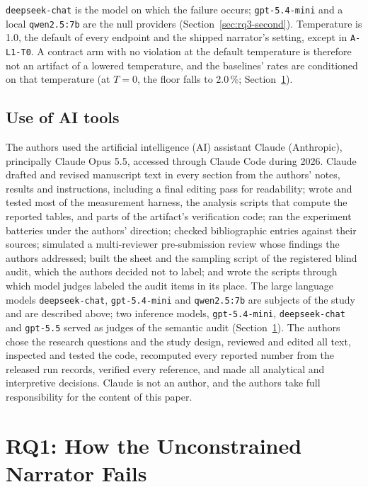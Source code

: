 \documentclass[smallextended,natbib]{svjour3}
\begin{document}
\texttt{deepseek-chat} is the model on which the failure occurs;
\texttt{gpt-5.4-mini} and a local \texttt{qwen2.5:7b} are the null providers
(Section~\ref{sec:rq3-second}). Temperature is 1.0, the default of every
endpoint and the shipped narrator's setting, except in \texttt{A-L1-T0}. A
contract arm with no violation at the default temperature is therefore not an
artifact of a lowered temperature, and the baselines' rates are conditioned on
that temperature (at $T=0$, the floor falls to 2.0\,\%;
Section~\ref{sec:rq1}).

\subsection{Use of AI tools}\label{sec:ai}
The authors used the artificial intelligence (AI) assistant Claude (Anthropic), principally Claude Opus 5.5, accessed
through Claude Code during 2026. Claude drafted and revised manuscript text in
every section from the authors' notes, results and instructions, including a
final editing pass for readability; wrote and tested most of the measurement
harness, the analysis scripts that compute the reported tables, and parts of
the artifact's verification code; ran the experiment batteries under the
authors' direction; checked bibliographic entries against their sources;
simulated a multi-reviewer pre-submission review whose findings the authors
addressed; built the sheet and the sampling script of the registered blind audit, which
the authors decided not to label; and wrote the scripts through which model
judges labeled the audit items in its place. The large language models
\texttt{deepseek-chat}, \texttt{gpt-5.4-mini} and \texttt{qwen2.5:7b} are
subjects of the study and are described above; two
inference models, \texttt{gpt-5.4-mini}, \texttt{deepseek-chat} and
\texttt{gpt-5.5} served as judges of the semantic audit
(Section~\ref{sec:rq1}). The authors chose the research
questions and the study design, reviewed and edited all text, inspected and
tested the code, recomputed every reported number from the released run
records, verified every reference, and made all analytical and interpretive
decisions. Claude is not an author, and the authors take full responsibility
for the content of this paper.

\section{RQ1: How the Unconstrained Narrator Fails}\label{sec:rq1}
\end{document}
